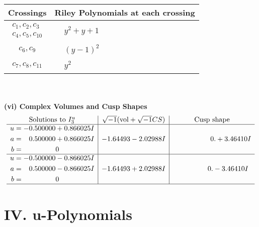 \documentclass[1p]{elsarticle_modified}
\theoremstyle{definition}
\newcommand{\I}{\sqrt{-1}}
\begin{document}
\begin{tabular}{m{50pt}|m{274pt}}
Crossings & \hspace{64pt}Riley Polynomials at each crossing \\
\hline $$\begin{aligned}c_{1},c_{2},c_{3}\\c_{4},c_{5},c_{10}\end{aligned}$$&$\begin{aligned}
&y^2+y+1
\end{aligned}$\\
\hline $$\begin{aligned}c_{6},c_{9}\end{aligned}$$&$\begin{aligned}
&(y-1)^2
\end{aligned}$\\
\hline $$\begin{aligned}c_{7},c_{8},c_{11}\end{aligned}$$&$\begin{aligned}
&y^2
\end{aligned}$\\
\hline
\end{tabular}\\~\\
\newpage\flushleft \textbf{(vi) Complex Volumes and Cusp Shapes}
$$\begin{array}{c|c|c}  
\text{Solutions to }I^u_{3}& \I (\text{vol} + \sqrt{-1}CS) & \text{Cusp shape}\\
 \hline 
\begin{aligned}
u &= -0.500000 + 0.866025 I \\
a &= \phantom{-}0.500000 + 0.866025 I \\
b &= \phantom{-0.000000 } 0\end{aligned}
 & -1.64493 - 2.02988 I & \phantom{-0.000000 -}0. + 3.46410 I \\ \hline\begin{aligned}
u &= -0.500000 - 0.866025 I \\
a &= \phantom{-}0.500000 - 0.866025 I \\
b &= \phantom{-0.000000 } 0\end{aligned}
 & -1.64493 + 2.02988 I & \phantom{-0.000000 } 0. - 3.46410 I\\
 \hline 
 \end{array}$$\newpage
\newpage\renewcommand{\arraystretch}{1}
\centering \section*{ IV. u-Polynomials}
\end{document}
